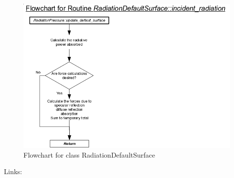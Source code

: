 \begin{figure}[!ht]
  \includegraphics[width = 6 in]{figs/flowchart/flow_default_incident_radiation.png}
  \caption{Flowchart for class RadiationDefaultSurface }
  \label{fig:flow_default_incident_radiation}
\end{figure}
Links: \newline
{}
\clearpage

